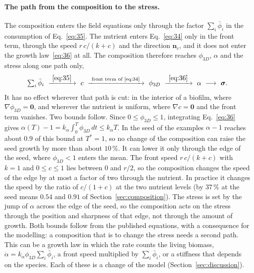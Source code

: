 \documentclass[11pt,a4paper]{article}
\newcommand{\phiD}{\phi_{3D}}
\newcommand{\lv}{\textstyle\sum_i\bar\phi_i}
\newcommand{\nc}{\mathbf n_c}
\begin{document}
\paragraph{The path from the composition to the stress.} The composition enters the field equations only through the factor $\lv$ in the consumption of Eq.~\eqref{eq:35}. The nutrient enters Eq.~\eqref{eq:34} only in the front term, through the speed $r\,c/(k+c)$ and the direction $\nc$, and it does not enter the growth law~\eqref{eq:36} at all. The composition therefore reaches $\phiD$, $\alpha$ and the stress along one path only,
\begin{equation}
\lv\ \xrightarrow{\ \eqref{eq:35}\ }\ c\ \xrightarrow{\ \text{front term of \eqref{eq:34}}\ }\ \phiD\ \xrightarrow{\ \eqref{eq:36}\ }\ \alpha\ \longrightarrow\ \boldsymbol\sigma.
\label{eq:path}
\end{equation}
It has no effect wherever that path is cut: in the interior of a biofilm, where $\nabla\phiD=\mathbf 0$, and wherever the nutrient is uniform, where $\nabla c=\mathbf 0$ and the front term vanishes. Two bounds follow. Since $0\le\phiD\le1$, integrating Eq.~\eqref{eq:36} gives $\alpha(T)-1=k_\alpha\int_0^T\phiD\,dt\le k_\alpha T$. In the seed of the examples $\alpha-1$ reaches about $0.9$ of this bound at $T^*=1$, so no change of the composition can raise the seed growth by more than about $10\,\%$. It can lower it only through the edge of the seed, where $\phiD<1$ enters the mean. The front speed $r\,c/(k+c)$ with $k=1$ and $0\le c\le1$ lies between $0$ and $r/2$, so the composition changes the speed of the edge by at most a factor of two through the nutrient. In practice it changes the speed by the ratio of $c/(1+c)$ at the two nutrient levels (by $37\,\%$ at the seed means $0.54$ and $0.91$ of Section~\ref{sec:composition}). The stress is set by the jump of $\alpha$ across the edge of the seed, so the composition acts on the stress through the position and sharpness of that edge, not through the amount of growth. Both bounds follow from the published equations, with a consequence for the modelling: a composition that is to change the stress needs a second path. This can be a growth law in which the rate counts the living biomass, $\dot\alpha=k_\alpha\phiD\lv$, a front speed multiplied by $\lv$, or a stiffness that depends on the species. Each of these is a change of the model (Section~\ref{sec:discussion}).
\end{document}
